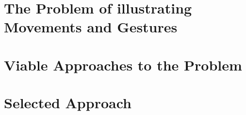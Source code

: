 
\section{The Problem of illustrating Movements and Gestures}

\section{Viable Approaches to the Problem}

\section{Selected Approach}




